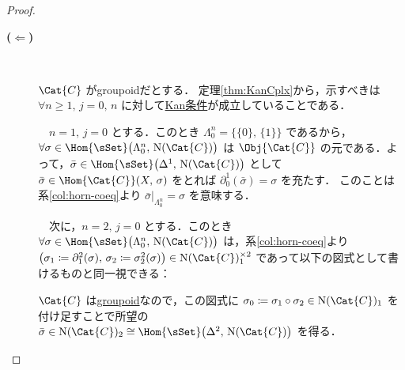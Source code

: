 \documentclass[TQFT_main]{subfiles}
\begin{document}
\begin{proof}
\begin{description}
        \item[\textbf{($\bm{\Longleftarrow}$)}]　
        
        $\Cat{C}$ がgroupoidだとする．
        定理\ref{thm:KanCplx}から，示すべきは $\forall n \ge 1,\, j = 0,\, n$ に対して\hyperref[def:KanCplx]{Kan条件}が成立していることである．
        
        　$n=1,\, j=0$ とする．このとき $\Lambda^n_0 = \bigl\{ \{0\},\, \{1\} \bigr\}$ であるから，
        $\forall \sigma \in \Hom{\sSet}\bigl( \Lambda^n_0,\, \mathrm{N}(\Cat{C}) \bigr)$ は $\Obj{\Cat{C}}$ の元である．よって，$\bar{\sigma} \in \Hom{\sSet}\bigl(\Delta^1,\, \mathrm{N}(\Cat{C})\bigr)$ として $\bar{\sigma} \in \Hom{\Cat{C}}(X,\, \sigma)$ をとれば $\partial^1_0(\bar{\sigma}) = \sigma$ を充たす．
        このことは系\ref{col:horn-coeq}より $\bar{\sigma}|_{\Lambda^n_0} = \sigma$ を意味する．

        　次に，$n=2,\, j=0$ とする．このとき $\forall \sigma \in \Hom{\sSet}\bigl( \Lambda^n_0,\, \mathrm{N}(\Cat{C}) \bigr)$ は，系\ref{col:horn-coeq}より $\bigl(\sigma_1 \coloneqq \partial^2_1(\sigma),\, \sigma_2 \coloneqq \sigma^2_2(\sigma)\bigr) \in \mathrm{N}(\Cat{C})_{1}^{\times 2}$ であって以下の図式として書けるものと同一視できる：
        \begin{center}
        \end{center}
        $\Cat{C}$ は\hyperref[def:groupoid]{groupoid}なので，この図式に $\sigma_0 \coloneqq \sigma_1 \circ \sigma_2 \in \mathrm{N}(\Cat{C})_1$ を付け足すことで所望の $\bar{\sigma} \in \mathrm{N}(\Cat{C})_2 \cong \Hom{\sSet} \bigl(\Delta^2,\, \mathrm{N}(\Cat{C})\bigr)$ を得る．


\end{description}
\end{proof}
\end{document}
